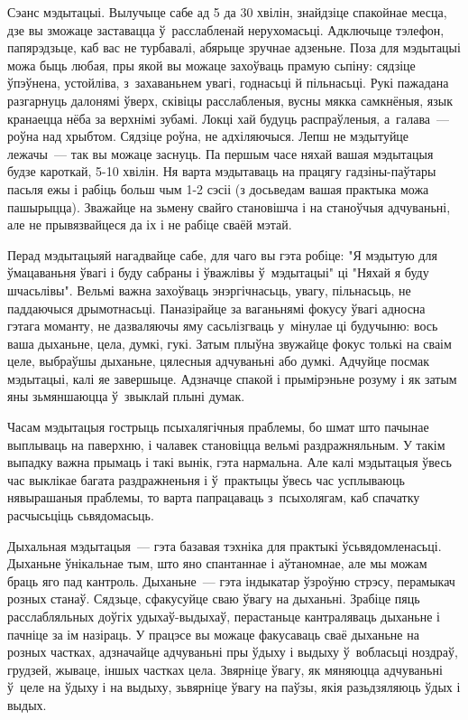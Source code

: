 Сэанс мэдытацыі. Вылучыце сабе ад 5 да 30 хвілін, знайдзіце спакойнае месца, дзе вы зможаце заставацца ў~расслабленай нерухомасьці. Адключыце тэлефон, папярэдзьце, каб вас не турбавалі, абярыце зручнае адзеньне. Поза для мэдытацыі можа быць любая, пры якой вы можаце захоўваць прамую сьпіну: сядзіце ўпэўнена, устойліва, з~захаваньнем увагі, годнасьці й пільнасьці. Рукі пажадана разгарнуць далонямі ўверх, сківіцы расслабленыя, вусны мякка самкнёныя, язык кранаецца нёба за верхнімі зубамі. Локці хай будуць распраўленыя, а~галава~--- роўна над хрыбтом. Сядзіце роўна, не адхіляючыся. Лепш не мэдытуйце лежачы~--- так вы можаце заснуць. Па першым часе няхай вашая мэдытацыя будзе кароткай, 5-10 хвілін. Ня варта мэдытаваць на працягу гадзіны-паўтары пасьля ежы і рабіць больш чым 1-2 сэсіі (з досьведам вашая практыка можа пашырыцца). Зважайце на зьмену свайго становішча і на станоўчыя адчуваньні, але не прывязвайцеся да іх і не рабіце сваёй мэтай. 

Перад мэдытацыяй нагадвайце сабе, для чаго вы гэта робіце: "Я мэдытую для ўмацаваньня ўвагі і буду сабраны і ўважлівы ў~мэдытацыі" ці "Няхай я буду шчасьлівы". Вельмі важна захоўваць энэргічнасьць, увагу, пільнасьць, не паддаючыся дрымотнасьці. Паназірайце за ваганьнямі фокусу ўвагі адносна гэтага моманту, не дазваляючы яму сасьлізгваць у~мінулае ці будучыню: вось ваша дыханьне, цела, думкі, гукі. Затым плыўна звужайце фокус толькі на сваім целе, выбраўшы дыханьне, цялесныя адчуваньні або думкі. Адчуйце посмак мэдытацыі, калі яе завершыце. Адзначце спакой і прымірэньне розуму і як затым яны зьмяншаюцца ў~звыклай плыні думак.

Часам мэдытацыя гострыць псыхалягічныя праблемы, бо шмат што пачынае выплываць на паверхню, і чалавек становіцца вельмі раздражняльным. У такім выпадку важна прымаць і такі вынік, гэта нармальна. Але калі мэдытацыя ўвесь час выклікае багата раздражненьня і ў~практыцы ўвесь час усплываюць нявырашаныя праблемы, то варта папрацаваць з~псыхолягам, каб спачатку расчысьціць сьвядомасьць.

Дыхальная мэдытацыя~--- гэта базавая тэхніка для практыкі ўсьвядомленасьці. Дыханьне ўнікальнае тым, што яно спантаннае і аўтаномнае, але мы можам браць яго пад кантроль. Дыханьне~--- гэта індыкатар ўзроўню стрэсу, перамыкач розных станаў. Сядзьце, сфакусуйце сваю ўвагу на дыханьні. Зрабіце пяць расслабляльных доўгіх удыхаў-выдыхаў, перастаньце кантраляваць дыханьне і пачніце за ім назіраць. У працэсе вы можаце факусаваць сваё дыханьне на розных частках, адзначайце адчуваньні пры ўдыху і выдыху ў~вобласьці ноздраў, грудзей, жываце, іншых частках цела. Звярніце ўвагу, як мяняюцца адчуваньні ў~целе на ўдыху і на выдыху, зьвярніце ўвагу на паўзы, якія разьдзяляюць ўдых і выдых.

